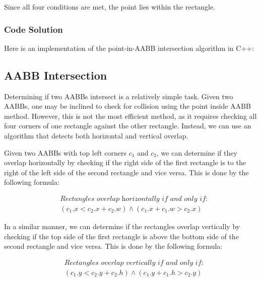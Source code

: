 Since all four conditions are met, the point lies within the rectangle.

\subsubsection{Code Solution}

Here is an implementation of the point-in-AABB intersection algorithm in C++:

\begin{mdframed}[linecolor=black!30!white,linewidth=.5pt,extratopheight=1em]
    
\end{mdframed}

\subsection{AABB Intersection}

Determining if two AABBs intersect is a relatively simple task. Given two
AABBs, one may be inclined to check for collision using the point inside AABB
method. However, this is not the most efficient method, as it requires checking
all four corners of one rectangle against the other rectangle. Instead, we can
use an algorithm that detects both horizontal and vertical overlap.

Given two AABBs with top left corners $c_1$ and $c_2$, we can determine if they
overlap horizontally by checking if the right side of the first rectangle is to
the right of the left side of the second rectangle and vice versa. This is done
by the following formula:

\begin{equation}
    \begin{aligned}
         & \textit{Rectangles overlap horizontally if and only if:} \\
         & (c_1.x < c_2.x + c_2.w) \land (c_1.x + c_1.w > c_2.x)
    \end{aligned}
\end{equation}

In a similar manner, we can determine if the rectangles overlap vertically by
checking if the top side of the first rectangle is above the bottom side of the
second rectangle and vice versa. This is done by the following formula:

\begin{equation}
    \begin{aligned}
         & \textit{Rectangles overlap vertically if and only if:} \\
         & (c_1.y < c_2.y + c_2.h) \land (c_1.y + c_1.h > c_2.y)
    \end{aligned}
\end{equation}

